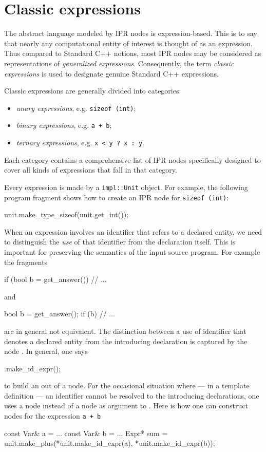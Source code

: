 \documentclass[a4paper,12pt]{article}
\begin{document}
\section{Classic expressions}
\label{sec:expression}

The abstract language modeled by IPR nodes is expression-based.  This is to
say that nearly any computational entity of interest is thought of as an
expression.   Thus compared to Standard C++ notions, most IPR nodes may be
considered as representations of \emph{generalized expressions}.
Consequently, the term \emph{classic expressions} is used to designate genuine
Standard C++ expressions.

Classic expressions are generally divided into categories:
\begin{itemize}
\item \emph{unary expressions}, e.g. \texttt{sizeof (int)};
\item \emph{binary expressions}, e.g. \texttt{a + b};
\item \emph{ternary expressions}, e.g. \texttt{x < y ? x : y}.
\end{itemize}

Each category contains a comprehensive list of IPR nodes specifically designed
to cover all kinds of expressions that fall in that category.

Every expression is made by a \texttt{impl::Unit} object.  For
example, the following program fragment shows how to create an IPR node for
\texttt{sizeof (int)}:
\begin{Program}
  unit.make_type_sizeof(unit.get_int());
\end{Program}

When an expression involves an identifier that refers to a declared entity,
we need to distinguish the \emph{use} of that identifier from the declaration
itself.  This is important for preserving the semantics of the input source
program.  For example the fragments
\begin{Program}
  if (bool b = get_answer())
     // ...
\end{Program}
and
\begin{Program}
  bool b = get_answer();
  if (b)
     // ...
\end{Program}
are in general not equivalent.  The distinction between a use of
identifier that denotes a declared entity from the introducing declaration is 
captured by the node .  In general, one says
\begin{Program}
  .make_id_expr();
\end{Program}
to build an  out of a  node.  For the occasional
situation where --- in a template definition --- an identifier cannot
be resolved to the introducing declarations, one uses a  node
instead of a  node as argument to .
Here is how one can construct nodes for the expression
\texttt{a + b}
\begin{Program}
  const Var& a = ...
  const Var& b = ...
  Expr* sum = unit.make_plus(*unit.make_id_expr(a), 
                             *unit.make_id_expr(b));
\end{Program}
\end{document}
